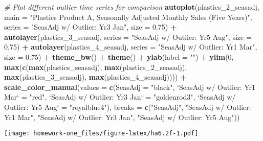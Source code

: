 \documentclass[openany]{book}
\newenvironment{Shaded}{\begin{snugshade}}{\end{snugshade}}
\newcommand{\CommentTok}[1]{\textcolor[rgb]{0.56,0.35,0.01}{\textit{#1}}}
\newcommand{\DataTypeTok}[1]{\textcolor[rgb]{0.13,0.29,0.53}{#1}}
\newcommand{\DecValTok}[1]{\textcolor[rgb]{0.00,0.00,0.81}{#1}}
\newcommand{\FloatTok}[1]{\textcolor[rgb]{0.00,0.00,0.81}{#1}}
\newcommand{\KeywordTok}[1]{\textcolor[rgb]{0.13,0.29,0.53}{\textbf{#1}}}
\newcommand{\NormalTok}[1]{#1}
\newcommand{\OperatorTok}[1]{\textcolor[rgb]{0.81,0.36,0.00}{\textbf{#1}}}
\newcommand{\StringTok}[1]{\textcolor[rgb]{0.31,0.60,0.02}{#1}}
\begin{document}
\begin{Shaded}
\begin{Highlighting}[]
\CommentTok{# Plot different outlier time series for comparison}
\KeywordTok{autoplot}\NormalTok{(plastics_}\DecValTok{2}\NormalTok{_seasadj, }\DataTypeTok{main =} \StringTok{"Plastics Product A, Seasonally Adjusted Monthly Sales (Five Years)"}\NormalTok{, }
  \DataTypeTok{series =} \StringTok{"SeasAdj w/ Outlier: Yr3 Jan"}\NormalTok{, }\DataTypeTok{size =} \FloatTok{0.75}\NormalTok{) }\OperatorTok{+}\StringTok{ }
\StringTok{  }\KeywordTok{autolayer}\NormalTok{(plastics_}\DecValTok{3}\NormalTok{_seasadj, }\DataTypeTok{series =} \StringTok{"SeasAdj w/ Outlier: Yr5 Aug"}\NormalTok{, }
    \DataTypeTok{size =} \FloatTok{0.75}\NormalTok{) }\OperatorTok{+}\StringTok{ }\KeywordTok{autolayer}\NormalTok{(plastics_}\DecValTok{4}\NormalTok{_seasadj, }\DataTypeTok{series =} \StringTok{"SeasAdj w/ Outlier: Yr1 Mar"}\NormalTok{, }
  \DataTypeTok{size =} \FloatTok{0.75}\NormalTok{) }\OperatorTok{+}\StringTok{ }\KeywordTok{theme_bw}\NormalTok{() }\OperatorTok{+}\StringTok{ }\KeywordTok{theme}\NormalTok{() }\OperatorTok{+}\StringTok{ }\KeywordTok{ylab}\NormalTok{(}\DataTypeTok{label =} \StringTok{""}\NormalTok{) }\OperatorTok{+}\StringTok{ }
\StringTok{  }\KeywordTok{ylim}\NormalTok{(}\DecValTok{0}\NormalTok{, }\KeywordTok{max}\NormalTok{(}\KeywordTok{c}\NormalTok{(}\KeywordTok{max}\NormalTok{(plastics_seasadj), }\KeywordTok{max}\NormalTok{(plastics_}\DecValTok{2}\NormalTok{_seasadj), }
    \KeywordTok{max}\NormalTok{(plastics_}\DecValTok{3}\NormalTok{_seasadj), }\KeywordTok{max}\NormalTok{(plastics_}\DecValTok{4}\NormalTok{_seasadj)))) }\OperatorTok{+}\StringTok{ }
\StringTok{  }\KeywordTok{scale_color_manual}\NormalTok{(}\DataTypeTok{values =} \KeywordTok{c}\NormalTok{(}\DataTypeTok{SeasAdj =} \StringTok{"black"}\NormalTok{, }\StringTok{`}\DataTypeTok{SeasAdj w/ Outlier: Yr1 Mar}\StringTok{`}\NormalTok{ =}\StringTok{ "red"}\NormalTok{, }
    \StringTok{`}\DataTypeTok{SeasAdj w/ Outlier: Yr3 Jan}\StringTok{`}\NormalTok{ =}\StringTok{ "goldenrod3"}\NormalTok{, }\StringTok{`}\DataTypeTok{SeasAdj w/ Outlier: Yr5 Aug}\StringTok{`}\NormalTok{ =}\StringTok{ "royalblue4"}\NormalTok{), }
    \DataTypeTok{breaks =} \KeywordTok{c}\NormalTok{(}\StringTok{"SeasAdj"}\NormalTok{, }\StringTok{"SeasAdj w/ Outlier: Yr1 Mar"}\NormalTok{, }
      \StringTok{"SeasAdj w/ Outlier: Yr3 Jan"}\NormalTok{, }\StringTok{"SeasAdj w/ Outlier: Yr5 Aug"}\NormalTok{))}
\end{Highlighting}
\end{Shaded}

\texttt{[image: homework-one\_files/figure-latex/ha6.2f-1.pdf]}
\end{document}
